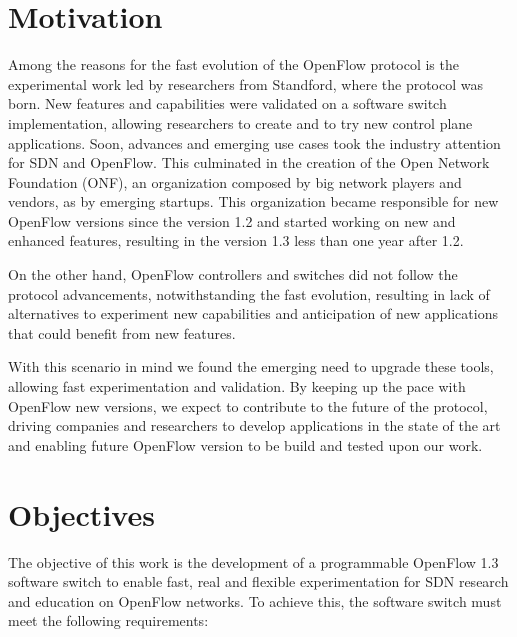 \section{Motivation}
\label{sec:sec01}

Among the reasons for the fast evolution of the OpenFlow protocol is the experimental work led by researchers from Standford, where the protocol was born. New features and capabilities were validated on a software switch implementation, allowing researchers to create and to try new control plane applications. Soon, advances and emerging use cases took the industry attention for SDN and OpenFlow. This culminated in the creation of the Open Network Foundation (ONF), an organization composed by big network players and vendors, as by emerging startups. This organization became responsible for new OpenFlow versions since the version 1.2 and started working on new and enhanced features, resulting in the version 1.3 less than one year after 1.2. 

On the other hand, OpenFlow controllers and switches did not follow the protocol advancements, notwithstanding the fast evolution, resulting in lack of alternatives to experiment new capabilities and anticipation of new applications that could benefit from new features.

With this scenario in mind we found the emerging need to upgrade these tools, allowing fast experimentation and validation. By keeping up the pace with OpenFlow new versions, we expect to contribute to the future of the protocol, driving companies and researchers to develop applications in the state of the art and  enabling future OpenFlow version to be build and tested upon our work.  

\section{Objectives}
\label{sec:sec02}

The objective of this work is the development of a programmable OpenFlow 1.3 software switch to enable fast, real and flexible experimentation for SDN research and education on OpenFlow networks. To achieve this, the software switch must meet the following requirements:  

